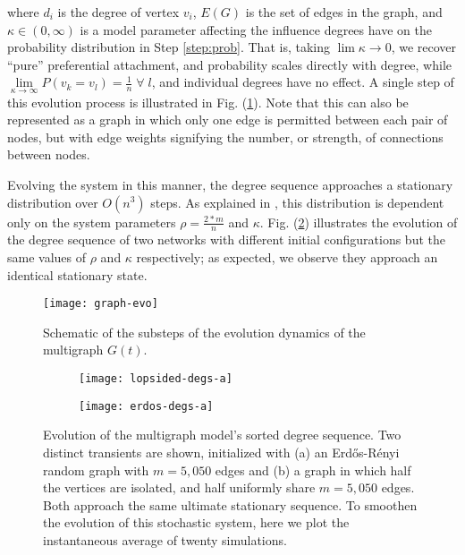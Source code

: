 \noindent where $d_i$ is the degree of vertex $v_i$, $E(G)$ is the set
of edges in the graph, and $\kappa \in (0, \infty)$ is a model
parameter affecting the influence degrees have on the probability
distribution in Step \ref{step:prob}.
%
That is, taking $\lim\limits{\kappa \rightarrow 0}$, we recover
``pure'' preferential attachment, and probability scales directly with
degree, while
$\lim\limits_{\kappa \rightarrow \infty} P(v_k = v_l) = \frac{1}{n} \;
\forall \; l$, and individual degrees have no effect. A single step of
this evolution process is illustrated in
Fig. ({\ref{fig:step-illustration}}). Note that this can also be
represented as a graph in which only one edge is permitted between
each pair of nodes, but with edge weights signifying the number, or
strength, of connections between nodes.
\par

Evolving the system in this manner, the degree sequence approaches a
stationary distribution over $O(n^3)$ steps.
%
As explained in \cite{rath_time_2012}, this distribution is dependent
only on the system parameters $\rho = \frac{2*m}{n}$ and $\kappa$.
%
Fig. (\ref{fig:dse}) illustrates the evolution of the degree sequence
of two networks with different initial configurations but the same
values of $\rho$ and $\kappa$ respectively; as expected, we observe
they approach an identical stationary state.

  \begin{figure}
    \centering
    \texttt{[image: graph-evo]}
    \caption[Schematic of the substeps involved in the multigraph
    evolution dynamics]{Schematic of the substeps of the evolution
      dynamics of the multigraph
      $G(t)$. \label{fig:step-illustration}}
  \end{figure}

  \begin{figure}
    \vspace{-5mm} \centering
    \begin{subfigure}[t]{0.49\textwidth}
      \centering
      \texttt{[image: lopsided-degs-a]}
      \subcaption{\label{fig:lopsided-init}}
    \end{subfigure} %
    \begin{subfigure}[t]{0.49\textwidth}
      \centering
      \texttt{[image: erdos-degs-a]}
      \subcaption{\label{fig:erdos-init}}
    \end{subfigure}
    \caption[Evolution of the multigraph model's sorted degree
    sequence]{Evolution of the multigraph model's sorted degree
      sequence. Two distinct transients are shown, initialized with
      (a) an Erd\H{o}s-R\'{e}nyi random graph with $m = 5,050$ edges
      and (b) a graph in which half the vertices are isolated, and
      half uniformly share $m = 5,050$ edges. Both approach the same
      ultimate stationary sequence. To smoothen the evolution of this
      stochastic system, here we plot the instantaneous average of
      twenty simulations. \label{fig:dse}}
  \end{figure}


